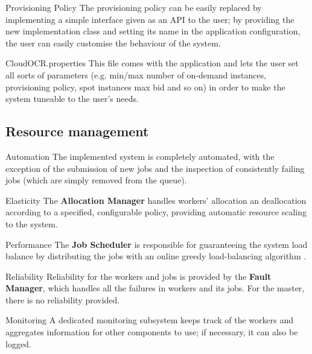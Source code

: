 \documentclass[a4paper]{IEEEtran}
\begin{document}
\begin{LaTeXdescription}
\item[Provisioning Policy]
The provisioning policy can be easily replaced by implementing a simple interface given as an API to the user; by providing the new implementation class and setting its name in the application configuration, the user can easily customise the behaviour of the system.

\item[CloudOCR.properties]
This file comes with the application and lets the user set all sorts of parameters (e.g. min/max number of on-demand instances, provisioning policy, spot instances max bid and so on) in order to make the system tuneable to the user's needs.

\end{LaTeXdescription}

\subsection*{Resource management}

\begin{LaTeXdescription}
\item[Automation]
The implemented system is completely automated, with the exception of the submission of new jobs and the inspection of consistently failing jobs (which are simply removed from the queue).

\item[Elasticity]
The \textbf{Allocation Manager} handles workers' allocation an deallocation according to a specified, configurable policy, providing automatic resource scaling to the system.

\item[Performance]
The \textbf{Job Scheduler} is responsible for guaranteeing the system load balance by distributing the jobs with an online greedy load-balancing algorithm \cite{kleinberg2006}.

\item[Reliability]
Reliability for the workers and jobs is provided by the \textbf{Fault Manager}, which handles all the failures in workers and its jobs. For the master, there is no reliability provided.

\item[Monitoring]
A dedicated monitoring subsystem keeps track of the workers and aggregates information for other components to use; if necessary, it can also be logged.

\end{LaTeXdescription}
\end{document}
